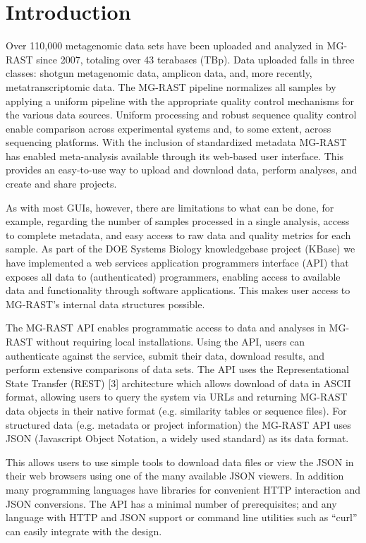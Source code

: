 \documentclass[letterpaper,10pt,english]{sphinxmanual}
\begin{document}
\section{Introduction}
\label{\detokenize{api:introduction}}\label{\detokenize{api:introduction-1}}
Over 110,000 metagenomic data sets have been uploaded and analyzed in
MG-RAST since 2007, totaling over 43 terabases (TBp). Data uploaded
falls in three classes: shotgun metagenomic data, amplicon data, and,
more recently, metatranscriptomic data. The MG-RAST pipeline normalizes
all samples by applying a uniform pipeline with the appropriate quality
control mechanisms for the various data sources. Uniform processing and
robust sequence quality control enable comparison across experimental
systems and, to some extent, across sequencing platforms. With the
inclusion of standardized metadata MG-RAST has enabled meta-analysis
available through its web-based user interface. This provides an
easy-to-use way to upload and download data, perform analyses, and
create and share projects.

As with most GUIs, however, there are limitations to what can be done,
for example, regarding the number of samples processed in a single
analysis, access to complete metadata, and easy access to raw data and
quality metrics for each sample. As part of the DOE Systems Biology
knowledgebase project (KBase) we have implemented a web services
application programmers interface (API) that exposes all data to
(authenticated) programmers, enabling access to available data and
functionality through software applications. This makes user access to
MG-RAST’s internal data structures possible.

The MG-RAST API enables programmatic access to data and analyses in
MG-RAST without requiring local installations. Using the API, users can
authenticate against the service, submit their data, download results,
and perform extensive comparisons of data sets. The API uses the
Representational State Transfer (REST) {[}3{]} architecture which allows
download of data in ASCII format, allowing users to query the system via
URLs and returning MG-RAST data objects in their native format (e.g.
similarity tables or sequence files). For structured data (e.g. metadata
or project information) the MG-RAST API uses JSON (Javascript Object
Notation, a widely used standard) as its data format.

This allows users to use simple tools to download data files or view the
JSON in their web browsers using one of the many available JSON viewers.
In addition many programming languages have libraries for convenient
HTTP interaction and JSON conversions. The API has a minimal number of
prerequisites; and any language with HTTP and JSON support or command
line utilities such as “curl” can easily integrate with the design.
\end{document}
